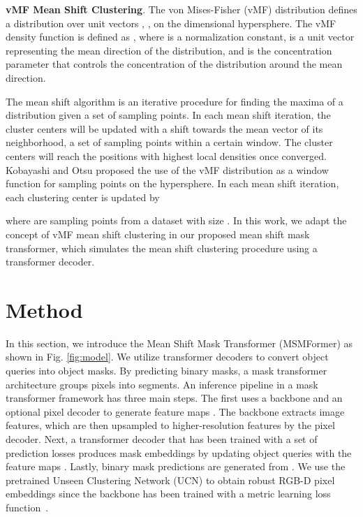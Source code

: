 \documentclass[letterpaper, 10 pt, conference]{ieeeconf}
\begin{document}
\textbf{vMF Mean Shift Clustering}. The von Mises-Fisher (vMF) \cite{mardia2000directional} distribution defines a distribution over unit vectors , , on the  dimensional hypersphere. The vMF density function is defined as , where  is a normalization constant,  is a unit vector representing the mean direction of the distribution, and  is the concentration parameter that controls the concentration of the distribution around the mean direction. 

The mean shift algorithm is an iterative procedure for finding the maxima of a distribution given a set of sampling points. In each mean shift iteration, the cluster centers will be updated with a shift towards the mean vector of its neighborhood, a set of sampling points within a certain window. The cluster centers will reach the positions with highest local densities once converged. Kobayashi and Otsu \cite{Kobayashi2010} proposed the use of the vMF distribution as a window function for sampling points on the hypersphere. In each mean shift iteration, each clustering center is updated by 

where  are sampling points from a dataset with size . In this work, we adapt the concept of vMF mean shift clustering in our proposed mean shift mask transformer, which simulates the mean shift clustering procedure using a transformer decoder.
\section{Method}











In this section, we introduce the Mean Shift Mask Transformer (MSMFormer) as shown in Fig. \ref{fig:model}.
We utilize transformer decoders to convert object queries into object masks. By predicting  binary masks, a mask transformer architecture groups pixels into  segments. An inference pipeline in a mask transformer framework has three main steps. The first uses a backbone and an optional pixel decoder to generate feature maps . The backbone extracts image features, which are then upsampled to higher-resolution features by the pixel decoder. Next, a transformer decoder that has been trained with a set of prediction losses produces mask embeddings  by updating object queries with the feature maps . Lastly, binary mask predictions are generated from . We use the pretrained Unseen Clustering Network (UCN) \cite{xiang2020learning} to obtain robust RGB-D pixel embeddings since the backbone has been trained with a metric learning loss function~\cite{xiang2020learning, de2017semantic, xie2019object}.
\end{document}
